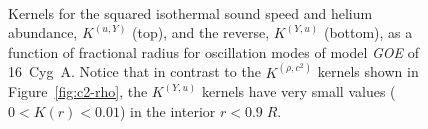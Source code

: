 \begin{figure}
    \centering
    \\
    \caption[${(u,Y)}$ kernels for 16~Cyg~A]{Kernels for the squared isothermal sound speed and helium abundance, $K^{(u, Y)}$ (top), and the reverse, $K^{(Y, u)}$ (bottom), as a function of fractional radius for oscillation modes of model \emph{GOE} of 16~Cyg~A. Notice that in contrast to the $K^{(\rho, c^2)}$ kernels shown in Figure~\ref{fig:c2-rho}, the $K^{(Y, u)}$ kernels have very small values (${0 < K(r) < 0.01}$) in the interior ${r < 0.9\; R}$. \label{fig:same-n-uY} }
\end{figure}


